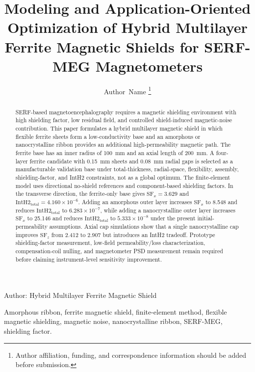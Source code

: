 \documentclass[letterpaper,journal]{IEEEtran}
\begin{document}
\title{Modeling and Application-Oriented Optimization of Hybrid Multilayer Ferrite Magnetic Shields for SERF-MEG Magnetometers}

\author{Author~Name%
\thanks{Author affiliation, funding, and correspondence information should be added before submission.}
}

%
{Author: Hybrid Multilayer Ferrite Magnetic Shield}

\maketitle

\begin{abstract}
SERF-based magnetoencephalography requires a magnetic shielding environment with high shielding factor, low residual field, and controlled shield-induced magnetic-noise contribution. This paper formulates a hybrid multilayer magnetic shield in which flexible ferrite sheets form a low-conductivity base and an amorphous or nanocrystalline ribbon provides an additional high-permeability magnetic path. The ferrite base has an inner radius of \SI{100}{mm} and an axial length of \SI{200}{mm}. A four-layer ferrite candidate with \SI{0.15}{mm} sheets and \SI{0.08}{mm} radial gaps is selected as a manufacturable validation base under total-thickness, radial-space, flexibility, assembly, shielding-factor, and IntH2 constraints, not as a global optimum. The finite-element model uses directional no-shield references and component-based shielding factors. In the transverse direction, the ferrite-only base gives $\mathrm{SF}_x=3.629$ and $\mathrm{IntH2}_{\mathrm{total}}=4.160\times10^{-6}$. Adding an amorphous outer layer increases $\mathrm{SF}_x$ to 8.548 and reduces $\mathrm{IntH2}_{\mathrm{total}}$ to $6.283\times10^{-7}$, while adding a nanocrystalline outer layer increases $\mathrm{SF}_x$ to 25.146 and reduces $\mathrm{IntH2}_{\mathrm{total}}$ to $5.333\times10^{-8}$ under the present initial-permeability assumptions. Axial cap simulations show that a single nanocrystalline cap improves $\mathrm{SF}_z$ from 2.412 to 2.907 but introduces an IntH2 tradeoff. Prototype shielding-factor measurement, low-field permeability/loss characterization, compensation-coil nulling, and magnetometer PSD measurement remain required before claiming instrument-level sensitivity improvement.
\end{abstract}

\begin{IEEEkeywords}
Amorphous ribbon, ferrite magnetic shield, finite-element method, flexible magnetic shielding, magnetic noise, nanocrystalline ribbon, SERF-MEG, shielding factor.
\end{IEEEkeywords}
\end{document}
